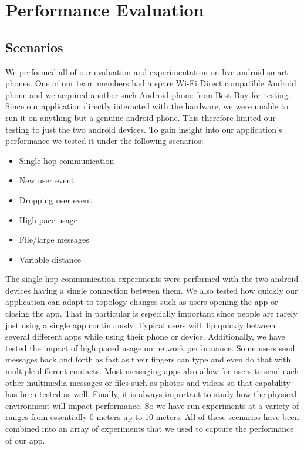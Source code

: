\documentclass[10pt]{article}
\begin{document}
\section{Performance Evaluation}
\subsection{Scenarios}

We performed all of our evaluation and experimentation on live android smart phones. One of our team members had a spare Wi-Fi Direct compatible Android phone and we acquired another such Android phone from Best Buy for testing. Since our application directly interacted with the hardware, we were unable to run it on anything but a genuine android phone. This therefore limited our testing to just the two android devices. To gain insight into our application's performance we tested it under the following scenarios:

\begin{itemize}
    \item Single-hop communication
    \item New user event
    \item Dropping user event
    \item High pace usage
    \item File/large messages
    \item Variable distance
\end{itemize}

The single-hop communication experiments were performed with the two android devices having a single connection between them. We also tested how quickly our application can adapt to topology changes such as users opening the app or closing the app. That in particular is especially important since people are rarely just using a single app continuously. Typical users will flip quickly between several different apps while using their phone or device. Additionally, we have tested the impact of high paced usage on network performance. Some users send messages back and forth as fast as their fingers can type and even do that with multiple different contacts. Most messaging apps also allow for users to send each other multimedia messages or files such as photos and videos so that capability has been tested as well. Finally, it is always important to study how the physical environment will impact performance. So we have run experiments at a variety of ranges from essentially 0 meters up to 10 meters. All of these scenarios have been combined into an array of experiments that we used to capture the performance of our app.
\end{document}
